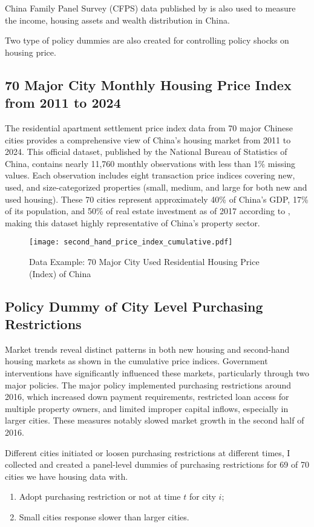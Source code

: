 \documentclass[12pt,english]{article}
\begin{document}
	China Family Panel Survey (CFPS) data published by \cite{cfps_database} is also used to measure the income, housing assets and wealth distribution in China.
	
	Two type of policy dummies are also created for controlling policy shocks on housing price.
	\subsection{70 Major City Monthly Housing Price Index from 2011 to 2024}
	The residential apartment settlement price index data from 70 major Chinese cities provides a comprehensive view of China's housing market from 2011 to 2024. This official dataset, published by the National Bureau of Statistics of China, contains nearly 11,760 monthly observations with less than 1\% missing values. Each observation includes eight transaction price indices covering new, used, and size-categorized properties (small, medium, and large for both new and used housing). These 70 cities represent approximately 40\% of China's GDP, 17\% of its population, and 50\% of real estate investment as of 2017 according to \cite{lu2021time}, making this dataset highly representative of China's property sector.
	
	\begin{figure}[htbp]
		\centering
		\texttt{[image: second\_hand\_price\_index\_cumulative.pdf]}
		\caption{Data Example: 70 Major City Used Residential Housing Price (Index) of China}
		\label{fig:1_4}
	\end{figure}
	
	\subsection{Policy Dummy of City Level Purchasing Restrictions}
	Market trends reveal distinct patterns in both new housing and second-hand housing markets as shown in the cumulative price indices. Government interventions have significantly influenced these markets, particularly through two major policies. The major policy implemented purchasing restrictions around 2016, which increased down payment requirements, restricted loan access for multiple property owners, and limited improper capital inflows, especially in larger cities. These measures notably slowed market growth in the second half of 2016.
	
	Different cities initiated or loosen purchasing restrictions at different times, I collected and created a panel-level dummies of purchasing restrictions for 69 of 70 cities we have housing data with.
	\begin{enumerate}
		\item Adopt purchasing restriction or not at time $t$ for city $i$;
		\item Small cities response slower than larger cities.
	\end{enumerate}
\end{document}
